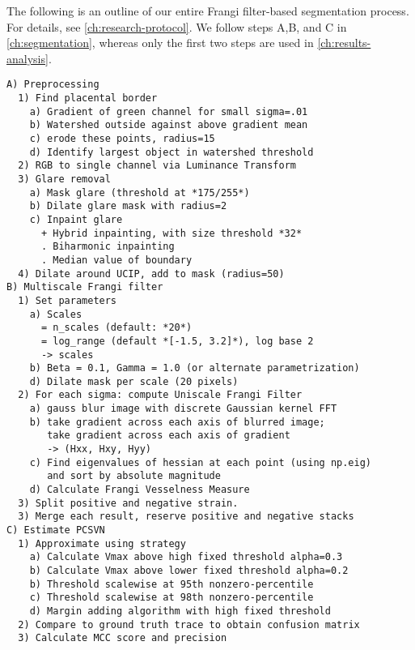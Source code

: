 The following is an outline of our entire Frangi filter-based segmentation process. For details, see \cref{ch:research-protocol}. We follow steps A,B, and C in \cref{ch:segmentation}, whereas only the first two steps are used in \cref{ch:results-analysis}.
    
    \begin{spacing}{1}
    \begin{small}
    \begin{verbatim}
A) Preprocessing
  1) Find placental border
  	a) Gradient of green channel for small sigma=.01
  	b) Watershed outside against above gradient mean
  	c) erode these points, radius=15
  	d) Identify largest object in watershed threshold
  2) RGB to single channel via Luminance Transform
  3) Glare removal
    a) Mask glare (threshold at *175/255*)
    b) Dilate glare mask with radius=2
    c) Inpaint glare
      + Hybrid inpainting, with size threshold *32*
      . Biharmonic inpainting
      . Median value of boundary
  4) Dilate around UCIP, add to mask (radius=50)
B) Multiscale Frangi filter
  1) Set parameters
    a) Scales
      = n_scales (default: *20*)
      = log_range (default *[-1.5, 3.2]*), log base 2
      -> scales
    b) Beta = 0.1, Gamma = 1.0 (or alternate parametrization)
    d) Dilate mask per scale (20 pixels)
  2) For each sigma: compute Uniscale Frangi Filter
    a) gauss blur image with discrete Gaussian kernel FFT
    b) take gradient across each axis of blurred image;
       take gradient across each axis of gradient
       -> (Hxx, Hxy, Hyy)
    c) Find eigenvalues of hessian at each point (using np.eig)
       and sort by absolute magnitude 
    d) Calculate Frangi Vesselness Measure
  3) Split positive and negative strain.
  3) Merge each result, reserve positive and negative stacks
C) Estimate PCSVN
  1) Approximate using strategy
    a) Calculate Vmax above high fixed threshold alpha=0.3
    b) Calculate Vmax above lower fixed threshold alpha=0.2
    b) Threshold scalewise at 95th nonzero-percentile
    c) Threshold scalewise at 98th nonzero-percentile
    d) Margin adding algorithm with high fixed threshold
  2) Compare to ground truth trace to obtain confusion matrix
  3) Calculate MCC score and precision
\end{verbatim}
    \end{small}
\end{spacing}